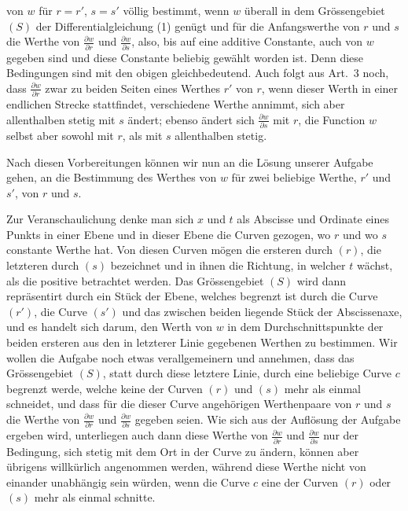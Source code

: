 \documentclass[12pt,a4paper]{book}
\theoremstyle{definition}
\theoremstyle{remark}
\begin{document}
von $w$ f\"ur $r = r'$, $s = s'$ v\"ollig bestimmt, wenn $w$ \"uberall in dem Gr\"ossengebiet $(S)$ der Differentialgleichung (1) gen\"ugt und f\"ur die Anfangswerthe von $r$ und $s$ die Werthe von $\frac{\partial w}{\partial r}$ und $\frac{\partial w}{\partial s}$, also, bis auf eine additive Constante, auch von $w$ gegeben sind und diese Constante beliebig gew\"ahlt worden ist. Denn diese Bedingungen sind mit den obigen gleichbedeutend. Auch folgt aus Art.~3 noch, dass $\frac{\partial w}{\partial r}$ zwar zu beiden Seiten eines Werthes $r'$ von $r$, wenn dieser Werth in einer endlichen Strecke stattfindet, verschiedene Werthe annimmt, sich aber allenthalben stetig mit $s$ \"andert; ebenso \"andert sich $\frac{\partial w}{\partial s}$ mit $r$, die Function $w$ selbst aber sowohl mit $r$, als mit $s$ allenthalben stetig.

Nach diesen Vorbereitungen k\"onnen wir nun an die L\"osung unserer Aufgabe gehen, an die Bestimmung des Werthes von $w$ f\"ur zwei beliebige Werthe, $r'$ und $s'$, von $r$ und $s$.

Zur Veranschaulichung denke man sich $x$ und $t$ als Abscisse und Ordinate eines Punkts in einer Ebene und in dieser Ebene die Curven gezogen, wo $r$ und wo $s$ constante Werthe hat. Von diesen Curven m\"ogen die ersteren durch $(r)$, die letzteren durch $(s)$ bezeichnet und in ihnen die Richtung, in welcher $t$ w\"achst, als die positive betrachtet werden. Das Gr\"ossengebiet $(S)$ wird dann repr\"asentirt durch ein St\"uck der Ebene, welches begrenzt ist durch die Curve $(r')$, die Curve $(s')$ und das zwischen beiden liegende St\"uck der Abscissenaxe, und es handelt sich darum, den Werth von $w$ in dem Durchschnittspunkte der beiden ersteren aus den in letzterer Linie gegebenen Werthen zu bestimmen. Wir wollen die Aufgabe noch etwas verallgemeinern und annehmen, dass das Gr\"ossengebiet $(S)$, statt durch diese letztere Linie, durch eine beliebige Curve $c$ begrenzt werde, welche keine der Curven $(r)$ und $(s)$ mehr als einmal schneidet, und dass f\"ur die dieser Curve angeh\"origen Werthenpaare von $r$ und $s$ die Werthe von $\frac{\partial w}{\partial r}$ und $\frac{\partial w}{\partial s}$ gegeben seien. Wie sich aus der Aufl\"osung der Aufgabe ergeben wird, unterliegen auch dann diese Werthe von $\frac{\partial w}{\partial r}$ und $\frac{\partial w}{\partial s}$ nur der Bedingung, sich stetig mit dem Ort in der Curve zu \"andern, k\"onnen aber \"ubrigens willk\"urlich angenommen werden, w\"ahrend diese Werthe nicht von einander unabh\"angig sein w\"urden, wenn die Curve $c$ eine der Curven $(r)$ oder $(s)$ mehr als einmal schnitte.
\end{document}
